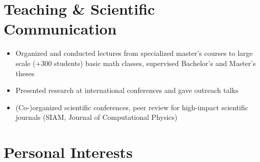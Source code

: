 \documentclass[11pt,a4paper]{moderncv}
\begin{document}
\section{Teaching \& Scientific Communication}

\begin{itemize}
  \item Organized and conducted lectures from specialized master's courses to large scale (+300 students) basic math classes, supervised Bachelor’s and Master’s theses

\item Presented research at international conferences and gave outreach talks

\item (Co-)organized scientific conferences, peer review for high-impact scientific journals (SIAM, Journal of Computational Physics)
\end{itemize}




\section{Personal Interests}




\end{document}
